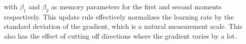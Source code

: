 with $\beta_1$ and $\beta_2$ as memory parameters for the first and
second moments respectively. This update rule
effectively normalizes the learning rate by the
standard deviation of the gradient, which is a natural
measurement scale. This also has the effect
of cutting off directions where the gradient varies
by a lot.

